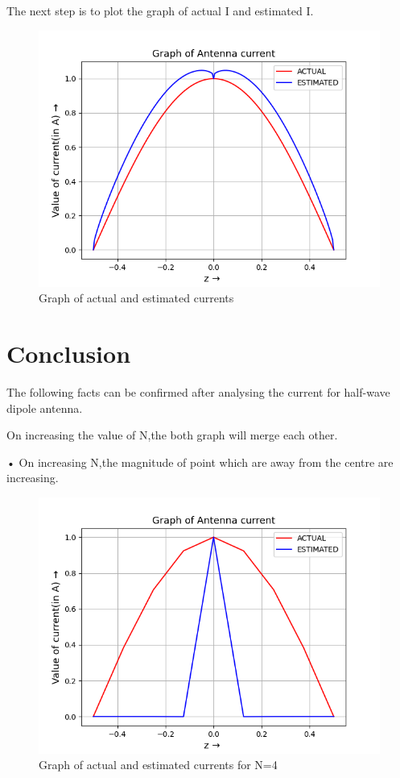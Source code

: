 \documentclass{article}
\begin{document}
The next step is to plot the graph of actual I and estimated I.
\begin{figure}[h!]
\centering
\includegraphics[scale=0.6]{Endsem_2.png}
\caption{Graph of actual and estimated currents}
\label{fig:universe}
\end{figure}

\section{Conclusion}
The following facts can be confirmed after analysing the current for half-wave dipole antenna.

On increasing the value of N,the both graph will merge each other.

• On increasing N,the magnitude of point which are away from the centre
are increasing.
\begin{figure}[h!]
\centering
\includegraphics[scale=0.6]{Endsem_1.png}
\caption{Graph of actual and estimated currents for N=4}
\label{fig:universe}
\end{figure}
\end{document}
